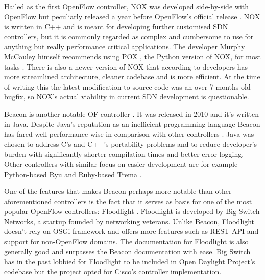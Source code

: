 \documentclass[english]{tktltiki2}
\theoremstyle{definition}
\theoremstyle{remark}
\begin{document}
	Hailed as the first OpenFlow controller, NOX was developed side-by-side with OpenFlow but peculiarly released a year before OpenFlow’s official release \cite{NOX}. NOX is written in C++ and is meant for developing further customised SDN controllers, but it is commonly regarded as complex and cumbersome to use for anything but really performance critical applications. The developer Murphy McCauley himself recommends using POX \cite{POX}, the Python version of NOX, for most tasks \cite{CHU12}. There is also a newer version of NOX that according to developers has more streamlined architecture, cleaner codebase and is more efficient. At the time of writing this the latest modification to source code was an over 7 months old bugfix, so NOX’s actual viability in current SDN development is questionable.

	Beacon is another notable OF controller \cite{Beacon}. It was released in 2010 and it’s written in Java. Despite Java’s reputation as an inefficient programming language Beacon has fared well performance-wise in comparison with other controllers \cite{Erickson13}. Java was chosen to address C’s and C++’s portability problems and to reduce developer’s burden with significantly shorter compilation times and better error logging. Other controllers with similar focus on easier development are for example Python-based Ryu \cite{Ryu} and Ruby-based Trema \cite{Trema}.

One of the features that makes Beacon perhaps more notable than other aforementioned controllers is the fact that it serves as basis for one of the most popular OpenFlow controllers: Floodlight \cite{Floodlight}. Floodlight is developed by Big Switch Networks, a startup founded by networking veterans. Unlike Beacon, Floodlight doesn’t rely on OSGi framework and offers more features such as REST API and support for non-OpenFlow domains. The documentation for Floodlight is also generally good and surpasses the Beacon documentation with ease.
 Big Switch has in the past lobbied for Floodlight to be included in Open Daylight Project’s codebase \cite{BAN13} but the project opted for Cisco’s controller implementation. 
\end{document}
